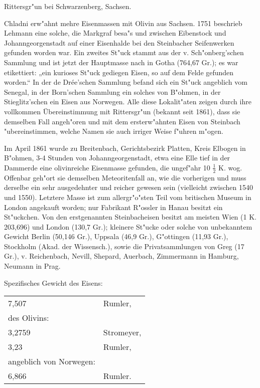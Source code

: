 \documentclass[a4paper, 11pt, oneside]{article}
\begin{document}
Rittersgr"un bei Schwarzenberg, Sachsen.

Chladni erw"ahnt mehre Eisenmassen mit Olivin aus Sachsen. 1751 beschrieb Lehmann eine solche, die Markgraf besa"s und zwischen Eibenstock und Johanngeorgenstadt auf einer Eisenhalde bei den Steinbacher Seifenwerken gefunden worden war. Ein zweites St"uck stammt aus der v. Sch"onberg'schen Sammlung und ist jetzt der Hauptmasse nach in Gotha (764,67 Gr.); es war etikettiert: „ein kurioses St"uck gediegen Eisen, so auf dem Felde gefunden worden.“ In der de Drée'schen Sammlung befand sich ein St"uck angeblich vom Senegal, in der Born'schen Sammlung ein solches von B"ohmen, in der Stieglitz'schen ein Eisen aus Norwegen. Alle diese Lokalit"aten zeigen durch ihre vollkommen Übereinstimmung mit Rittersgr"un (bekannt seit 1861), dass sie demselben Fall angeh"oren und mit dem ersterw"ahnten Eisen von Steinbach "ubereinstimmen, welche Namen sie auch irriger Weise f"uhren m"ogen.

Im April 1861 wurde zu Breitenbach, Gerichtsbezirk Platten, Kreis Elbogen in B"ohmen, 3-4 Stunden von Johanngeorgenstadt, etwa eine Elle tief in der Dammerde eine olivinreiche Eisenmasse gefunden, die ungef"ahr 10 $\frac{1}{2}$ K. wog. Offenbar geh"ort sie demselben Meteoritenfall an, wie die vorherigen und muss derselbe ein sehr ausgedehnter und reicher gewesen sein (vielleicht zwischen 1540 und 1550). Letztere Masse ist zum allergr"o"sten Teil vom britischen Museum in London angekauft worden; nur Fabrikant R"ossler in Hanau besitzt ein St"uckchen. Von den erstgenannten Steinbacheisen besitzt am meisten Wien (1 K. 203,696) und London (130,7 Gr.); kleinere St"ucke oder solche von unbekanntem Gewicht Berlin (50,146 Gr.), Uppsala (46,9 Gr.), G"ottingen (11,93 Gr.), Stockholm (Akad. der Wissensch.), sowie die Privatsammlungen von Greg (17 Gr.), v. Reichenbach, Nevill, Shepard, Auerbach, Zimmermann in Hamburg, Neumann in Prag.

Spezifisches Gewicht des Eisens:
\begin{table}[!ht]
    \centering
    \begin{tabular}{l l}
        7,507 & Rumler,\\
        des Olivins: & \\
        3,2759 & Stromeyer,\\
        3,23 & Rumler,\\
        angeblich von Norwegen: &\\
        6,866 & Rumler.
    \end{tabular}
\end{table}
\end{document}
